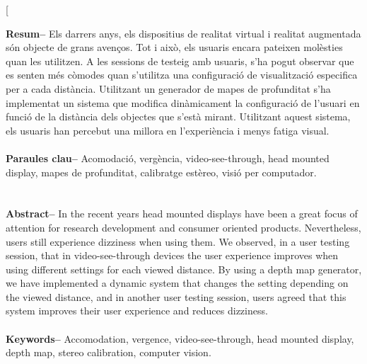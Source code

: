 \documentclass[10pt,a4paper,twocolumn,twoside]{article}
\begin{document}
	\twocolumn[\begin{@twocolumnfalse}
	
	
	\maketitle
	
	\thispagestyle{primerapagina}
	\begin{center}
	\parbox{0.915\textwidth}
	{\sffamily
	\textbf{Resum--}
	Els darrers anys, els dispositius de realitat virtual i realitat augmentada són objecte de grans avenços. Tot i això, els usuaris encara pateixen molèsties quan les utilitzen. A les sessions de testeig amb usuaris, s'ha pogut observar que es senten més còmodes quan s'utilitza una configuració de visualització especifica per a cada distància. Utilitzant un generador de mapes de profunditat s'ha implementat un sistema que modifica dinàmicament la configuració de l'usuari en funció de la distància dels objectes que s'està mirant. Utilitzant aquest sistema, els usuaris han percebut una millora en l'experiència i menys fatiga visual.
	\\
	\\
	\textbf{Paraules clau-- } Acomodació, vergència, video-see-through, head mounted display, mapes de profunditat, calibratge estèreo, visió per computador.\\
	\\
	\bigskip
	\\
	\textbf{Abstract--} In the recent years head mounted displays have been a great focus of attention for research development and consumer oriented products. Nevertheless, users still experience dizziness when using them. We observed, in a user testing session, that in video-see-through devices the user experience improves when using different settings for each viewed distance. By using a depth map generator, we have implemented a dynamic system that changes the setting depending on the viewed distance, and in another user testing session, users agreed that this system improves their user experience and reduces dizziness. 
	\\
	\\
	\textbf{Keywords-- } Accomodation, vergence, video-see-through, head mounted display, depth map, stereo calibration,  computer vision. 
	}
	

\end{center}
\end{@twocolumnfalse}
\end{document}
